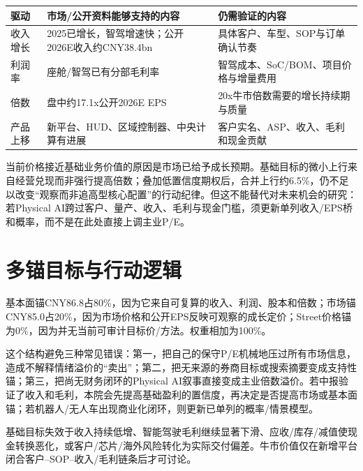 \begin{exhibitbox}
\small
\begin{tabularx}{\textwidth}{L{2.7cm}Y Y}
\toprule
驱动 & 市场/公开资料能够支持的内容 & 仍需验证的内容 \\
\midrule
收入增长 & 2025已增长，智驾增速快；公开2026E收入约CNY38.4bn & 具体客户、车型、SOP与订单确认节奏 \\
利润率 & 座舱/智驾已有分部毛利率 & 智驾成本、SoC/BOM、项目价格与增量费用 \\
倍数 & 盘中约17.1x公开2026E EPS & 20x牛市倍数需要的增长持续期与质量 \\
产品上移 & 新平台、HUD、区域控制器、中央计算有进展 & 客户实名、ASP、收入、毛利和现金贡献 \\
\bottomrule
\end{tabularx}
\end{exhibitbox}

当前价格接近基础业务价值的原因是市场已给予成长预期。基础目标的微小上行来自经营兑现而非强行提高倍数；叠加低置信度期权后，合并上行约6.5\%，仍不足以改变“观察而非追高型核心配置”的行动纪律。但这不能替代对未来机会的研究：若Physical AI跨过客户、量产、收入、毛利与现金门槛，须更新单列收入/EPS桥和概率，而不是在此处直接上调主业P/E。

\section{多锚目标与行动逻辑}

基本面锚CNY86.8占80\%，因为它来自可复算的收入、利润、股本和倍数；市场锚CNY85.0占20\%，因为市场价格和公开EPS反映可观察的成长定价；Street价格锚为0\%，因为并无当前可审计目标价/方法。权重相加为100\%。

这个结构避免三种常见错误：第一，把自己的保守P/E机械地压过所有市场信息，造成不解释情绪溢价的“卖出”；第二，把无来源的券商目标或搜索摘要变成支持性锚；第三，把尚无财务闭环的Physical AI叙事直接变成主业倍数溢价。若中报验证了收入和毛利，本院会先提高基础盈利的置信度，再决定是否提高市场或基本面锚；若机器人/无人车出现商业化闭环，则更新已单列的概率/情景模型。

\begin{riskbox}[估值失效条件]
基础目标失效于收入持续低增、智能驾驶毛利继续显著下滑、应收/库存/减值使现金转换恶化，或客户/芯片/海外风险转化为实际交付偏差。牛市价值仅在新增平台闭合客户--SOP--收入/毛利链条后才可讨论。
\end{riskbox}
